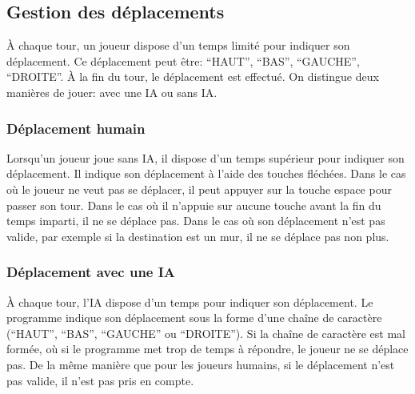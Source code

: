 	\subsection{Gestion des déplacements}
	\label{subsec:gestion_deplacements}
	À chaque tour, un joueur dispose d'un temps limité pour indiquer son déplacement. Ce déplacement peut être: ``HAUT'', ``BAS'', ``GAUCHE'', ``DROITE''. À la fin du tour, le déplacement est effectué. On distingue deux manières de jouer: avec une IA ou sans IA\@.

	\subsubsection*{Déplacement humain}
	Lorsqu'un joueur joue sans IA, il dispose d'un temps supérieur pour indiquer son déplacement. Il indique son déplacement à l'aide des touches fléchées. \color{red}Dans le cas où le joueur ne veut pas se déplacer, il peut appuyer sur la touche espace pour passer son tour.\color{black} Dans le cas où il n'appuie sur aucune touche avant la fin du temps imparti, il ne se déplace pas. Dans le cas où son déplacement n'est pas valide, par exemple si la destination est un mur, il ne se déplace pas non plus.

	\subsubsection*{Déplacement avec une IA}
	À chaque tour, l'IA dispose d'un temps pour indiquer son déplacement. Le programme indique son déplacement sous la forme d'une chaîne de caractère (``HAUT'', ``BAS'', ``GAUCHE'' ou ``DROITE''). Si la chaîne de caractère est mal formée, où si le programme met trop de temps à répondre, le joueur ne se déplace pas. De la même manière que pour les joueurs humains, si le déplacement n'est pas valide, il n'est pas pris en compte.
